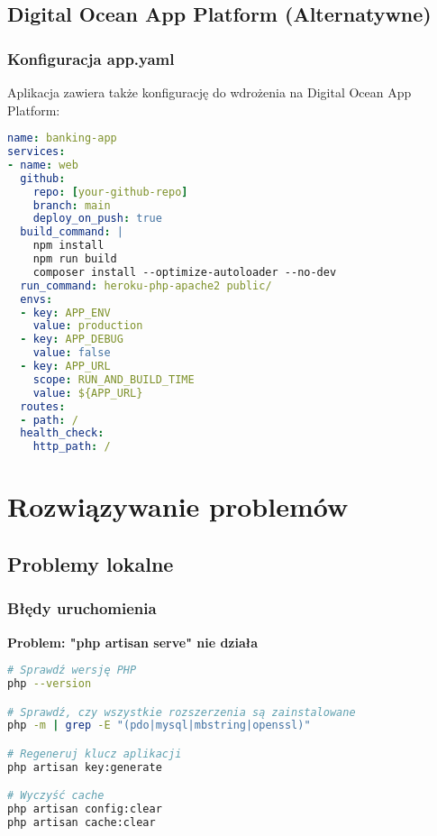 \documentclass[12pt,a4paper]{article}
\begin{document}
    \subsection{Digital Ocean App Platform (Alternatywne)}

    \subsubsection{Konfiguracja app.yaml}

    Aplikacja zawiera także konfigurację do wdrożenia na Digital Ocean App Platform:

    \begin{lstlisting}[language=yaml, caption=Konfiguracja .do/app.yaml]
name: banking-app
services:
- name: web
  github:
    repo: [your-github-repo]
    branch: main
    deploy_on_push: true
  build_command: |
    npm install
    npm run build
    composer install --optimize-autoloader --no-dev
  run_command: heroku-php-apache2 public/
  envs:
  - key: APP_ENV
    value: production
  - key: APP_DEBUG
    value: false
  - key: APP_URL
    scope: RUN_AND_BUILD_TIME
    value: ${APP_URL}
  routes:
  - path: /
  health_check:
    http_path: /
    \end{lstlisting}

    \section{Rozwiązywanie problemów}

    \subsection{Problemy lokalne}

    \subsubsection{Błędy uruchomienia}

    \textbf{Problem: "php artisan serve" nie działa}
    \begin{lstlisting}[language=bash]
# Sprawdź wersję PHP
php --version

# Sprawdź, czy wszystkie rozszerzenia są zainstalowane
php -m | grep -E "(pdo|mysql|mbstring|openssl)"

# Regeneruj klucz aplikacji
php artisan key:generate

# Wyczyść cache
php artisan config:clear
php artisan cache:clear
    \end{lstlisting}
\end{document}
